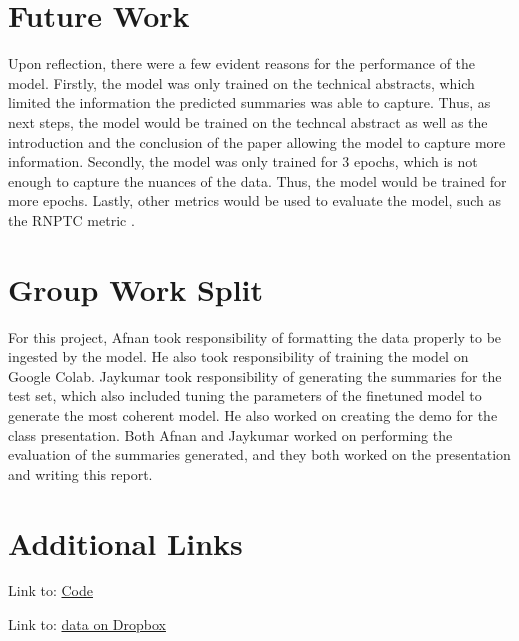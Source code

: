 \documentclass[11pt,a4paper]{article}
\begin{document}
\section{Future Work}

\indent \indent Upon reflection, there were a few evident reasons for the performance of the model. Firstly, the model was only trained on the technical abstracts, which limited the information the predicted summaries was able to capture. Thus, as next steps, the model would be trained on the techncal abstract as well as the introduction and the conclusion of the paper allowing the model to capture more information. Secondly, the model was only trained for 3 epochs, which is not enough to capture the nuances of the data. Thus, the model would be trained for more epochs. Lastly, other metrics would be used to evaluate the model, such as the RNPTC metric \cite{luo2022readability}.

\appendix

\section{Group Work Split}
\indent \indent For this project, Afnan took responsibility of formatting the data properly to be ingested by the model. He also took responsibility of training the model on Google Colab. Jaykumar took responsibility of generating the summaries for the test set, which also included tuning the parameters of the finetuned model to generate the most coherent model. He also worked on creating the demo for the class presentation. Both Afnan and Jaykumar worked on performing the evaluation of the summaries generated, and they both worked on the presentation and writing this report.

\newpage

\section{Additional Links}

Link to: \href{https://github.com/afnanmmir/Research-Paper-Summarizer}{Code}

\par

\noindent Link to: \href{https://www.dropbox.com/s/huwm01glsk9fou0/plos_readability_ctrl_sum_corpus.rar?dl=0}{data on Dropbox}




\end{document}
